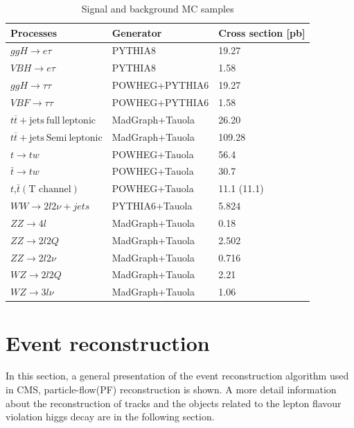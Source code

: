 \begin{table}[hbtp]
 \begin{center}
  \caption{Signal and background MC samples}
  \label{tab:mcdatasets}
  \begin{tabular}{l|l|l}
Processes & Generator & Cross section [pb] \\\hline
$ggH\to e\tau $     &          PYTHIA8                     &  19.27                \\\hline
$VBH\to e\tau$     &          PYTHIA8                      &   1.58                \\  \hline
$ggH \to \tau\tau$ &POWHEG+PYTHIA6              &  19.27           \\\hline
 $VBF\to\tau\tau$  &POWHEG+PYTHIA6              &   1.58           \\  \hline
$t\overline{t}+\textrm{jets}~ \textrm{full}~\textrm{leptonic}$  &  MadGraph+Tauola                &  26.20                \\\hline
$t\overline{t}+\textrm{jets}~\textrm{Semi}~\textrm{leptonic}$   & MadGraph+Tauola           &  109.28               \\ \hline
$t \to tw$              &   POWHEG+Tauola     &    56.4 \\\hline
$\bar{t} \to tw$              &   POWHEG+Tauola     &    30.7 \\\hline
$t$,$\bar{t}(\textrm{T channel})$           & POWHEG+Tauola        &   11.1 (11.1)          \\ \hline
$WW \to 2l2\nu+jets$    & PYTHIA6+Tauola                  & 5.824\\ \hline
$ZZ\to 4l$               & MadGraph+Tauola                 & 0.18                  \\  \hline
$ZZ\to 2l2Q$             &MadGraph+Tauola              &   2.502               \\  \hline
$ZZ\to 2l2\nu$           &MadGraph+Tauola              &    0.716              \\  \hline
$WZ\to 2l2Q$             &MadGraph+Tauola                &    2.21               \\  \hline
$WZ\to 3l\nu$            &MadGraph+Tauola           & 1.06                  \\  \hline
  \end{tabular}
 \end{center}
\end{table}





\section{Event reconstruction}
In this section, a general presentation of the event reconstruction algorithm used in CMS, particle-flow(PF) reconstruction is shown. A more detail information about the reconstruction of tracks and the objects related to the lepton flavour violation higgs decay are in the following section. 

